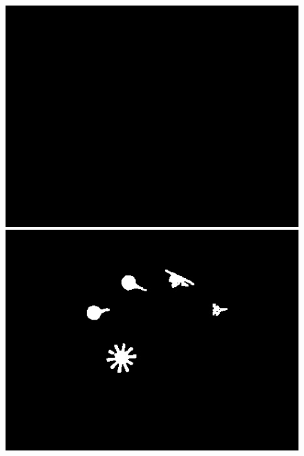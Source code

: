 \documentclass[a4paper]{ctexart}
\begin{document}
\begin{enumerate}[label=\arabic*、]
\begin{enumerate}[label=\alph*)]
\begin{figure}[htbp]
\begin{minipage}[t]{0.25\textwidth}
			\end{minipage}\\
			\begin{minipage}[t]{0.25\textwidth}
				\centering
				\includegraphics[width=\textwidth]{figure/drop_2/img3.jpg}
			\end{minipage}
			\begin{minipage}[t]{0.25\textwidth}
				\centering
				\includegraphics[width=\textwidth]{figure/drop_2/img4.jpg}
			\end{minipage}
			\begin{minipage}[t]{0.25\textwidth}
				\centering

\end{minipage}
\end{figure}
\end{enumerate}
\end{enumerate}
\end{document}
